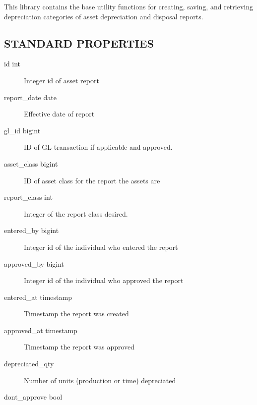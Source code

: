 \begin{description}
\begin{description}
\begin{description}
\begin{description}
\begin{description}
\begin{description}
\begin{description}
\begin{description}
This library contains the base utility functions for creating, saving, and
retrieving depreciation categories of asset depreciation and disposal reports.

\subsection*{STANDARD PROPERTIES\label{LedgerSMB::DBObject::Asset_Report_STANDARD_PROPERTIES}}
\begin{description}

\item[{id int}] \mbox{}

Integer id of asset report


\item[{report\_date date}] \mbox{}

Effective date of report


\item[{gl\_id bigint}] \mbox{}

ID of GL transaction if applicable and approved.


\item[{asset\_class bigint}] \mbox{}

ID of asset class for the report the assets are


\item[{report\_class int}] \mbox{}

Integer of the report class desired.


\item[{entered\_by bigint}] \mbox{}

Integer id of the individual who entered the report


\item[{approved\_by bigint}] \mbox{}

Integer id of the individual who approved the report


\item[{entered\_at timestamp}] \mbox{}

Timestamp the report was created


\item[{approved\_at timestamp}] \mbox{}

Timestamp the report was approved


\item[{depreciated\_qty}] \mbox{}

Number of units (production or time) depreciated


\item[{dont\_approve bool}] \mbox{}


\end{description}
\end{description}
\end{description}
\end{description}
\end{description}
\end{description}
\end{description}
\end{description}
\end{description}
